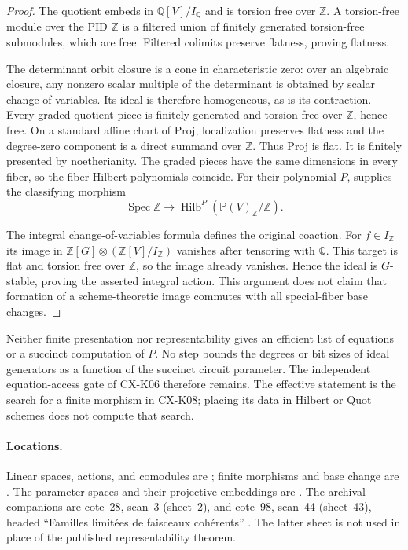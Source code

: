 \documentclass[11pt,a4paper]{article}
\begin{document}
\begin{proof}
The quotient embeds in $\mathbb Q[V]/I_{\mathbb Q}$ and is torsion free
over $\mathbb Z$.  A torsion-free module over the PID $\mathbb Z$ is a
filtered union of finitely generated torsion-free submodules, which are
free.  Filtered colimits preserve flatness, proving flatness.

The determinant orbit closure is a cone in characteristic zero: over an
algebraic closure, any nonzero scalar multiple of the determinant is
obtained by scalar change of variables.  Its ideal is therefore homogeneous,
as is its contraction.  Every graded quotient piece is finitely generated
and torsion free over $\mathbb Z$, hence free.  On a standard affine chart
of Proj, localization preserves flatness and the degree-zero component is
a direct summand over $\mathbb Z$.  Thus Proj is flat.  It is finitely
presented by noetherianity.  The graded pieces have the same dimensions in
every fiber, so the fiber Hilbert polynomials coincide.  For their polynomial
$P$, \cite[\S3, Theorem~3.2]{FGA221} supplies the classifying morphism
\[
 \operatorname{Spec}\mathbb Z\longrightarrow
 \operatorname{Hilb}^{P}(\mathbb P(V)_{\mathbb Z}/\mathbb Z).
\]

The integral change-of-variables formula defines the original coaction.
For $f\in I_{\mathbb Z}$ its image in
$\mathbb Z[G]\otimes(\mathbb Z[V]/I_{\mathbb Z})$ vanishes after tensoring
with $\mathbb Q$.  This target is flat and torsion free over $\mathbb Z$,
so the image already vanishes.  Hence the ideal is $G$-stable, proving the
asserted integral action.  This argument does not claim that formation of
a scheme-theoretic image commutes with all special-fiber base changes.
\end{proof}

Neither finite presentation nor representability gives an efficient list
of equations or a succinct computation of $P$.  No step bounds the degrees
or bit sizes of ideal generators as a function of the succinct circuit
parameter.  The independent equation-access gate of CX-K06 therefore remains.
The effective statement is the search for a finite morphism in CX-K08;
placing its data in Hilbert or Quot schemes does not compute that search.

\paragraph{Locations.}
Linear spaces, actions, and comodules are
\cite[Exp.~I 4.6.3.1, 4.7.1--4.7.2]{SGA3}; finite morphisms and base change
are \cite[6.1.4--6.1.5]{EGA2}.  The parameter spaces and their projective
embeddings are \cite[\S3, Theorems~3.1--3.2, pp.~259--260;
Proposition~3.8, p.~265]{FGA221}.
The archival companions are cote~28, scan~3 (sheet~2), and cote~98,
scan~44 (sheet~43), headed ``Familles limit\'ees de faisceaux coh\'erents''
\cite{Archive28,Archive98}.  The latter sheet is not used in place of the
published representability theorem.
\end{document}

